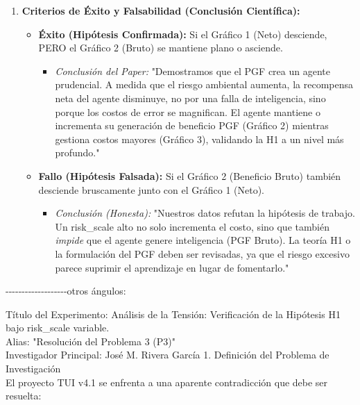 \begin{enumerate}
\begin{itemize}
    \begin{itemize}
    \item
      \emph{Predicción:} Esta línea será \textbf{fuertemente
      ascendente}, mostrando que el costo ambiental es el único
      responsable de la caída en el Gráfico 1.
    \end{itemize}
  \end{itemize}
\item
  \textbf{Criterios de Éxito y Falsabilidad (Conclusión Científica):}

  \begin{itemize}
  \item
    \textbf{Éxito (Hipótesis Confirmada):} Si el Gráfico 1 (Neto)
    desciende, PERO el Gráfico 2 (Bruto) se mantiene plano o asciende.

    \begin{itemize}
    \item
      \emph{Conclusión del Paper:} "Demostramos que el PGF crea un
      agente prudencial. A medida que el riesgo ambiental aumenta, la
      recompensa neta del agente disminuye, no por una falla de
      inteligencia, sino porque los costos de error se magnifican. El
      agente mantiene o incrementa su generación de
      \textquotesingle beneficio PGF\textquotesingle{} (Gráfico 2)
      mientras gestiona costos mayores (Gráfico 3), validando la H1 a un
      nivel más profundo."
    \end{itemize}
  \item
    \textbf{Fallo (Hipótesis Falsada):} Si el Gráfico 2 (Beneficio
    Bruto) también desciende bruscamente junto con el Gráfico 1 (Neto).

    \begin{itemize}
    \item
      \emph{Conclusión (Honesta):} "Nuestros datos refutan la hipótesis
      de trabajo. Un risk\_scale alto no solo incrementa el costo, sino
      que también \emph{impide} que el agente genere inteligencia (PGF
      Bruto). La teoría H1 o la formulación del PGF deben ser revisadas,
      ya que el riesgo excesivo parece suprimir el aprendizaje en lugar
      de fomentarlo."
    \end{itemize}
  \end{itemize}
\end{enumerate}

-\/-\/-\/-\/-\/-\/-\/-\/-\/-\/-\/-\/-\/-\/-\/-\/-\/-\/-otros ángulos:

Título del Experimento: Análisis de la Tensión: Verificación de la
Hipótesis H1 bajo risk\_scale variable.\\
Alias: "Resolución del Problema 3 (P3)"\\
Investigador Principal: José M. Rivera García 1. Definición del Problema
de Investigación\\
El proyecto TUI v4.1 se enfrenta a una aparente contradicción que debe
ser resuelta:

